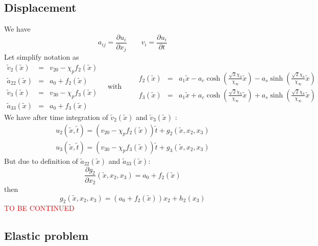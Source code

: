 \documentclass[
10pt, %
a4paper, %
oneside, %
headinclude,footinclude, %
table
]{scrartcl}
\begin{document}
\subsection{Displacement}
We have
$$
%
a_{ij}=\frac{\partial u_{i}}{\partial x_{j}}
\quad\quad
v_{i}=\frac{\partial u_{i}}{\partial t}
$$
Let simplify notation as 
$$
\begin{array}{rcl}
\tilde{v}_{2}(\tilde{x}) &=&v_{20}-\chi _p f_{2}(\tilde{x})
 \\
\tilde{a}_{22}(\tilde{x}) &=&a_{0}+ f_{2}(\tilde{x})
\\
\tilde{v}_{3}(\tilde{x}) &=&v_{30}-\chi _p f_{3}(\tilde{x})
 \\
\tilde{a}_{33}(\tilde{x}) &=&a_{0}+ f_{3}(\tilde{x})
\end{array} 
\quad \textrm{with}
\quad\quad
\begin{array}{rcl}
f_{2}(\tilde{x})&=&a_{1} \tilde{x}-a_{c} \cosh
   (\frac{\sqrt{2}  \chi _h}{\chi _{\infty }}\tilde{x})-a_{s} \sinh
   (\frac{\sqrt{2}  \chi _h}{\chi _{\infty }}\tilde{x})
   \\
f_{3}(\tilde{x})&=&a_{1} \tilde{x}+a_{c} \cosh
   (\frac{\sqrt{2}  \chi _h}{\chi _{\infty }}\tilde{x})+a_{s} \sinh
   (\frac{\sqrt{2}  \chi _h}{\chi _{\infty }}\tilde{x})
   \end{array} 
$$
We have after time integration of $\tilde{v}_{2}(\tilde{x}) $ and $\tilde{v}_{3}(\tilde{x})$ :
$$
\begin{array}{rcl}
u_{2}(\tilde{x},\tilde{t})=\left(v_{20}-\chi _p f_{2}(\tilde{x})\right)\tilde{t} +g_{2}(\tilde{x},x_{2},x_{3})
\\
u_{3}(\tilde{x},\tilde{t})=\left(v_{30}-\chi _p f_{3}(\tilde{x})\right)\tilde{t} +g_{3}(\tilde{x},x_{2},x_{3})
   \end{array} 
$$
But due to definition of $\tilde{a}_{22}(\tilde{x})$ and $\tilde{a}_{33}(\tilde{x})$:
$$
\frac{\partial g_{2}}{\partial x_{2}}(\tilde{x},x_{2},x_{3}) = a_{0}+f_{2}(\tilde{x})
$$
then 
$$
 g_{2}(\tilde{x},x_{2},x_{3}) = \left(a_{0}+f_{2}(\tilde{x})\right) x_{2} + h_{2}(x_{3})
$$
\textcolor{red}{TO BE CONTINUED}
\subsection{Elastic problem}
\end{document}
